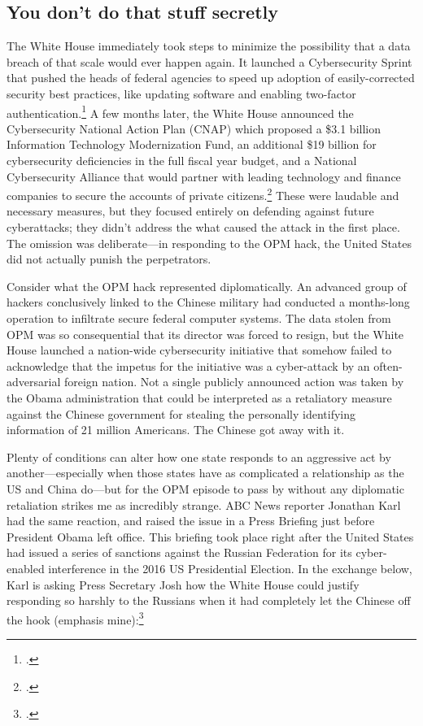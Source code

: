 \documentclass{memoir}
\begin{document}
\begin{refsegment}
\subsection{You don't do that stuff secretly}
The White House immediately took steps to minimize the possibility that a data breach of that scale would ever happen again. It launched a Cybersecurity Sprint that pushed the heads of federal agencies to speed up adoption of easily-corrected security best practices, like updating software and enabling two-factor authentication.\footcite{koerner_inside_2016} A few months later, the White House announced the Cybersecurity National Action Plan (CNAP) which proposed a \$3.1 billion Information Technology Modernization Fund, an additional \$19 billion for cybersecurity deficiencies in the full fiscal year budget, and a National Cybersecurity Alliance that would partner with leading technology and finance companies to secure the accounts of private citizens.\footcite{the_white_house_fact_2016} These were laudable and necessary measures, but they focused entirely on defending against future cyberattacks; they didn't address the what caused the attack in the first place. The omission was deliberate---in responding to the OPM hack, the United States did not actually punish the perpetrators.

Consider what the OPM hack represented diplomatically. An advanced group of hackers conclusively linked to the Chinese military had conducted a months-long operation to infiltrate secure federal computer systems. The data stolen from OPM was so consequential that its director was forced to resign, but the White House launched a nation-wide cybersecurity initiative that somehow failed to acknowledge that the impetus for the initiative was a cyber-attack by an often-adversarial foreign nation. Not a single publicly announced action was taken by the Obama administration that could be interpreted as a retaliatory measure against the Chinese government for stealing the personally identifying information of 21 million Americans. The Chinese got away with it.

Plenty of conditions can alter how one state responds to an aggressive act by another---especially when those states have as complicated a relationship as the US and China do---but for the OPM episode to pass by without any diplomatic retaliation strikes me as incredibly strange. ABC News reporter Jonathan Karl had the same reaction, and raised the issue in a Press Briefing just before President Obama left office. This briefing took place right after the United States had issued a series of sanctions against the Russian Federation for its cyber-enabled interference in the 2016 US Presidential Election. In the exchange below, Karl is asking Press Secretary Josh how the White House could justify responding so harshly to the Russians when it had completely let the Chinese off the hook (emphasis mine):\footcite[You can watch the full exchange via video here. It's pretty awkward.]{gill_earnest_2017}


\end{refsegment}
\end{document}
